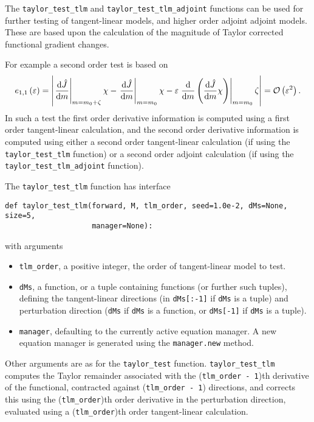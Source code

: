 \documentclass[11pt]{article}
\begin{document}
The \texttt{taylor\_test\_tlm} and \texttt{taylor\_test\_tlm\_adjoint}
functions can be used for further testing of tangent-linear models, and higher
order adjoint adjoint models. These are based upon the calculation of the
magnitude of Taylor corrected functional gradient changes.

For example a second order test is based on
\begin{equation*}
  e_{1,1} \left( \varepsilon \right) = \left|
    \left. \frac{\mathrm{d} \hat{J}}{\mathrm{d} m} \right|_{m = m_0 + \zeta} \chi
    - \left. \frac{\mathrm{d} \hat{J}}{\mathrm{d} m} \right|_{m = m_0} \chi
    - \varepsilon \left. \frac{\mathrm{d}}{\mathrm{d} m} \left( \frac{\mathrm{d} \hat{J}}{\mathrm{d} m} \chi \right) \right|_{m = m_0} \zeta
    \right| = {\cal O} \left( \varepsilon^2 \right).
\end{equation*}
In such a test the first order derivative information is computed using a first
order tangent-linear calculation, and the second order derivative information
is computed using either a second order tangent-linear calculation (if using
the \texttt{taylor\_test\_tlm} function) or a second order adjoint calculation
(if using the \texttt{taylor\_test\_tlm\_adjoint} function).

The \texttt{taylor\_test\_tlm} function has interface
\begin{lstlisting}
def taylor_test_tlm(forward, M, tlm_order, seed=1.0e-2, dMs=None, size=5,
                    manager=None):
\end{lstlisting}
with arguments
\begin{itemize}
  \item \texttt{tlm\_order}, a positive integer, the order of tangent-linear
    model to test.
  \item \texttt{dMs}, a function, or a tuple containing functions (or further
    such tuples), defining the tangent-linear directions (in \texttt{dMs[:-1]}
    if \texttt{dMs} is a tuple) and perturbation direction (\texttt{dMs} if
    \texttt{dMs} is a function, or \texttt{dMs[-1]} if \texttt{dMs} is a
    tuple).
  \item \texttt{manager}, defaulting to the currently active equation manager.
    A new equation manager is generated using the \texttt{manager.new} method.
\end{itemize}
Other arguments are as for the \texttt{taylor\_test} function.
\texttt{taylor\_test\_tlm} computes the Taylor remainder associated with the
(\texttt{tlm\_order - 1})th derivative of the functional, contracted against
(\texttt{tlm\_order - 1}) directions, and corrects this using the
(\texttt{tlm\_order})th order derivative in the perturbation direction,
evaluated using a (\texttt{tlm\_order})th order tangent-linear calculation.
\end{document}
